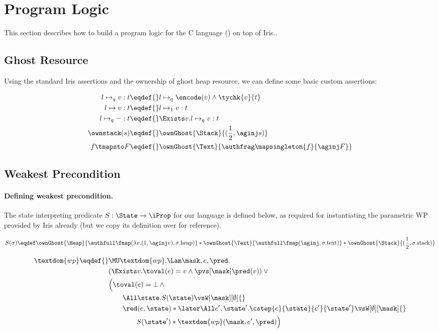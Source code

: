 \section{Program Logic}
\label{sec:program-logic}

This section describes how to build a program logic for the C language (\cf {}) on top of Iris..

\subsection{Ghost Resource}

Using the standard Iris assertions and the ownership of ghost heap resource, we can define some basic custom assertions:

\begin{align*}
l \mapsto_q v : t \eqdef{}&  l \mapsto_q \encode(v) \land \tychk{v}{t} \\
l \mapsto v : t              \eqdef{}& l \mapsto_1 v : t\\
l \mapsto_q - : t            \eqdef{}& \Exists v. l \mapsto_q v : t\\
\ownstack(s) \eqdef{}& \ownGhost{\Stack}{(\frac12, \aginj s)} \\
f \tmapsto F \eqdef{}& \ownGhost{\Text}{\authfrag \mapsingleton{f}{\aginj F}}
\end{align*}

\subsection{Weakest Precondition}

\paragraph{Defining weakest precondition.}

The state interpreting predicate $S : \State \to \iProp$ for our \irisc{} language is defined below, as required for
instantiating the parametric WP provided by Iris already (but we copy its definition over for reference).

\[S(\sigma) \eqdef 
  \ownGhost{\Heap}{\authfull \fmap (\lambda v. (1, \aginj v), \sigma.\text{heap})} *
  \ownGhost{\Text}{\authfull \fmap (\aginj, \sigma.\text{text})} *
  \ownGhost{\Stack}{(\frac12, \sigma.\text{stack})}
\]

\begin{align*}
  \textdom{wp} \eqdef{}& \MU \textdom{wp}. \Lam \mask, e, \pred. \\
        & (\Exists v. \toval(e) = v \land \pvs[\mask] \pred(v)) \lor {}\\
        & \Bigl(\toval(e) = \bot \,\land \\
        &\qquad \All \state. S(\state) \vsW[\mask][\emptyset] {}\\
        &\qquad \red(e, \state) * \later\All e', \state'. \cstep{e}{\state}{e'}{\state'} \vsW[\emptyset][\mask] {}\\
        &\qquad\qquad S(\state') * \textdom{wp}(\mask, e', \pred)\Bigr) \\
\end{align*}

